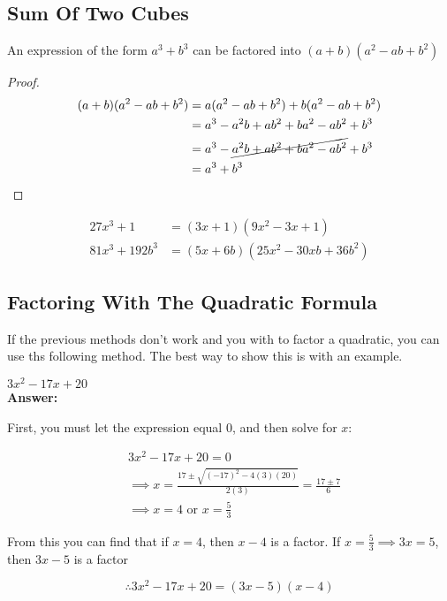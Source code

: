 \documentclass[english,course]{lecture}
\begin{document}
\subsection{Sum Of Two Cubes}

\begin{theorem}
	An expression of the form $a^3 + b^3$ can be factored into $(a + b)(a^2 - ab + b^2)$
\end{theorem}

\begin{proof}
	\begin{align*}
		(a+b)(a^2 - ab +b^2 )
		  & = a(a^2 - ab +b^2 ) + b(a^2 - ab +b^2 )          \\
		  & = a^3 - a^2b + ab^2 + ba^2 - ab^2 + b^3          \\
		  & = a^3 - \cancel{a^2b + ab^2 + ba^2 - ab^2} + b^3 \\
		  & = a^3 + b^3
	\end{align*}
\end{proof}

\begin{example}[Factor]
	\begin{align*}
		27x^3 + 1      & = (3x + 1)(9x^2 - 3x + 1)         \\
		81x^3 + 192b^3 & = (5x + 6b)(25x^2 - 30xb + 36b^2)
	\end{align*}
\end{example}

\subsection{Factoring With The Quadratic Formula}

If the previous methods don't work and you with to factor a quadratic, you can use ths following method.
The best way to show this is with an example.

\begin{example}[Factor]
	$3x^2 - 17x + 20$\\
	\textbf{Answer:}

	First, you must let the expression equal $0$, and then solve for $x$:

	\begin{align*}
		  & 3x^2 - 17x + 20 = 0                        \\
		  & \implies x
		= \frac{17 \pm \sqrt{(-17)^2 - 4(3)(20)}}{2(3)}
		= \frac{17 \pm 7}{6}\\
		  & \implies x = 4 \text{ or } x = \frac{5}{3}
	\end{align*}

	From this you can find that if $x = 4$, then $x- 4$ is a factor.
	If $x = \frac{5}{3} \implies 3x = 5$, then $3x - 5$ is a factor

	$$
		\therefore 3x^2 - 17x + 20 = (3x -5)(x - 4)
	$$
\end{example}
\end{document}
